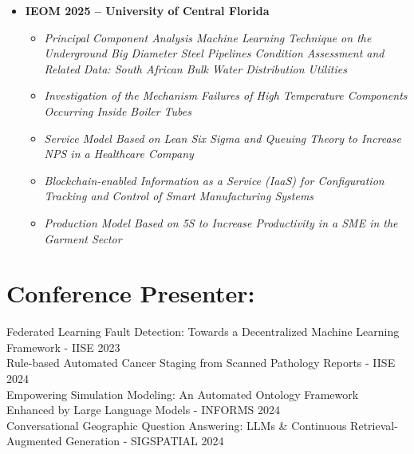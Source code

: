 \documentclass[10pt, letterpaper]{article}
\begin{document}
\begin{itemize}
    \item \textbf{IEOM 2025 – University of Central Florida}
    \begin{itemize}
        \item \textit{Principal Component Analysis Machine Learning Technique on the Underground Big Diameter Steel Pipelines Condition Assessment and Related Data: South African Bulk Water Distribution Utilities}
        \item \textit{Investigation of the Mechanism Failures of High Temperature Components Occurring Inside Boiler Tubes}
        \item \textit{Service Model Based on Lean Six Sigma and Queuing Theory to Increase NPS in a Healthcare Company}
        \item \textit{Blockchain-enabled Information as a Service (IaaS) for Configuration Tracking and Control of Smart Manufacturing Systems}
        \item \textit{Production Model Based on 5S to Increase Productivity in a SME in the Garment Sector}
    \end{itemize}
\end{itemize}


\section{Conference Presenter:}
Federated Learning Fault Detection: Towards a Decentralized Machine Learning Framework - IISE 2023\\
\vspace{0.3cm}
Rule-based Automated Cancer Staging from Scanned Pathology Reports - IISE 2024\\
\vspace{0.3cm}
Empowering Simulation Modeling: An Automated Ontology Framework Enhanced by Large Language Models - INFORMS 2024\\
\vspace{0.3cm}
Conversational Geographic Question Answering: LLMs \& Continuous Retrieval-Augmented Generation - SIGSPATIAL 2024\\
\vspace{0.3cm}

\end{document}
